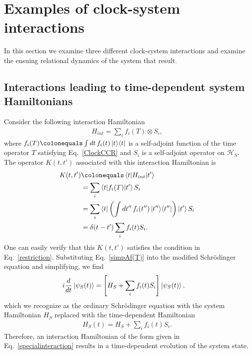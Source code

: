 \documentclass[a4paper,twocolumn,superscriptaddress,11pt,accepted=2019-06-04]{quantumarticle}
\newcommand{\ce}{\colonequals}
\newcommand{\nn}{\nonumber}		%
\begin{document}
{%
\section{Examples of clock-system interactions}
\label{examples}

In this section we examine three different clock-system interactions and examine the ensuing relational dynamics of the system that result.

\subsection{Interactions leading to time-dependent system Hamiltonians}

Consider the following interaction Hamiltonian
\begin{align}
 H_{int} =  \sum_i f_i(T) \otimes S_i, \label{specialinteraction}
\end{align}
where {$f_i(T) \ce \int dt \, f_i(t) \ket{t} \! \bra{t}$} is a self-adjoint function of the time operator $T$ satisfying Eq.~\eqref{ClockCCR} and $S_i$ is a self-adjoint operator on $\mathcal{H}_S$. The operator $K(t,t')$ associated with this interaction Hamiltonian is
\begin{align}
K(t,t') &\ce \braket{t | H_{int} | t' } \nn \\
&=  \sum_i \braket{t | f_i(T)| t'}  S_i \nn \\
&=  \sum_i \bra{t} \left(\int dt'' \,  f_i(t'') \ket{t''} \!\bra{t''} \right) \ket{t'}  S_i \nn \\
&= \delta(t-t') \sum_i f_i(t) S_i. \label{simpAf(T)}
\end{align}
One can easily verify that this $K(t,t')$ satisfies the condition in Eq.~\eqref{restriction}. Substituting Eq.~\eqref{simpAf(T)} into the modified Schr\"{o}dinger equation and simplifying, we find
\begin{align}
i \frac{d}{dt} \ket{\psi_S(t)} &=  \left[ H_S +  \sum_i f_i(t) S_i  \right]\ket{\psi_S(t)}, \nn
\end{align}
which we recognize as the ordinary Schr\"{o}dinger equation with the system Hamiltonian $H_S$ replaced with the time-dependent Hamiltonian
\begin{align}
H_S(t) = H_S +  \sum_i f_i(t) S_i . \nn
\end{align}
Therefore, an interaction Hamiltonian of the form given in Eq.~\eqref{specialinteraction} results in a time-dependent evolution of the system state.

}
\end{document}
